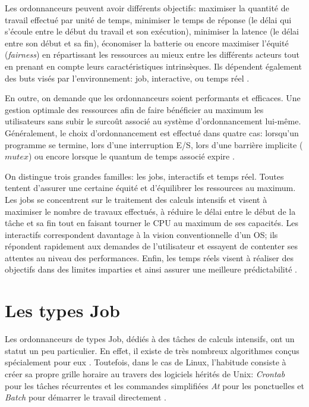 \documentclass[letterpaper]{article}
\begin{document}
Les ordonnanceurs peuvent avoir différents objectifs: maximiser la quantité de travail effectué par unité de temps, minimiser le temps de réponse (le délai qui s'écoule entre le début du travail et son exécution), minimiser la latence (le délai entre son début et sa fin), économiser la batterie ou encore maximiser l'équité (\textit{fairness}) en répartissant les ressources au mieux entre les différents acteurs tout en prenant en compte leurs caractéristiques intrinsèques.
Ils dépendent également des buts visés par l'environnement: job, interactive, ou temps réel \citep{Hansen:1973:OSP:540365}.

En outre, on demande que les ordonnanceurs soient performants et efficaces. Une gestion optimale des ressources afin de faire bénéficier au maximum les utilisateurs sans subir le surcoût associé au système d'ordonnancement lui-même. Généralement, le choix d'ordonnancement est effectué dans quatre cas: lorsqu'un programme se termine, lors d'une interruption E/S, lors d'une barrière implicite ($mutex$) ou encore lorsque le quantum de temps associé expire \citep{Bovet:2005:ULK:1077084}.

On distingue trois grandes familles: les jobs, interactifs et temps réel. Toutes tentent d'assurer une certaine équité et d'équilibrer les ressources au maximum. Les jobs se concentrent sur le traitement des calculs intensifs et visent à maximiser le nombre de travaux effectués, à réduire le délai entre le début de la tâche et sa fin tout en faisant tourner le CPU au maximum de ses capacités. Les interactifs correspondent davantage à la vision conventionnelle d'un OS; ils répondent rapidement aux demandes de l'utilisateur et essayent de contenter ses attentes au niveau des performances. Enfin, les temps réels visent à réaliser des objectifs dans des limites imparties et ainsi assurer une meilleure prédictabilité \citep{Tanenbaum:2005:OSD:1076555}.

\section{Les types Job}

Les ordonnanceurs de types Job, dédiés à des tâches de calculs intensifs, ont un statut un peu particulier. En effet, il existe de très nombreux algorithmes conçus spécialement pour eux \citep{journals/cce/MendezCGHF06}. Toutefois, dans le cas de Linux, l'habitude consiste à créer sa propre grille horaire au travers des logiciels hérités de Unix: \textit{Crontab} pour les tâches récurrentes et les commandes simplifiées \textit{At} pour les ponctuelles et \textit{Batch} pour démarrer le travail directement \citep{x1994x}.
\end{document}
